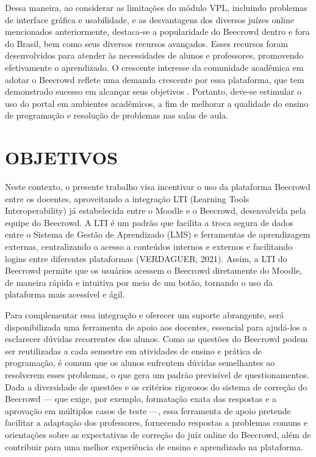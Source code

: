 Dessa maneira, ao considerar as limitações do módulo VPL, incluindo problemas de interface gráfica e usabilidade, e as desvantagens dos diversos juízes online mencionados anteriormente, destaca-se a popularidade do Beecrowd dentro e fora do Brasil, bem como seus diversos recursos avançados. Esses recursos foram desenvolvidos para atender às necessidades de alunos e professores, promovendo efetivamente o aprendizado. O crescente interesse da comunidade acadêmica em adotar o Beecrowd reflete uma demanda crescente por essa plataforma, que tem demonstrado sucesso em alcançar seus objetivos \cite[p.~31]{ferreira2022}. Portanto, deve-se estimular o uso do portal em ambientes acadêmicos, a fim de melhorar a qualidade do ensino de programação e resolução de problemas nas salas de aula.

\section{OBJETIVOS}

Neste contexto, o presente trabalho visa incentivar o uso da plataforma Beecrowd entre os docentes, aproveitando a integração LTI (Learning Tools Interoperability) já estabelecida entre o Moodle e o Beecrowd, desenvolvida pela equipe do Beecrowd. A LTI é um padrão que facilita a troca segura de dados entre o Sistema de Gestão de Aprendizado (LMS) e ferramentas de aprendizagem externas, centralizando o acesso a conteúdos internos e externos e facilitando logins entre diferentes plataformas (VERDAGUER, 2021). Assim, a LTI do Beecrowd permite que os usuários acessem o Beecrowd diretamente do Moodle, de maneira rápida e intuitiva por meio de um botão, tornando o uso da plataforma mais acessível e ágil.

Para complementar essa integração e oferecer um suporte abrangente, será disponibilizada uma ferramenta de apoio aos docentes, essencial para ajudá-los a esclarecer dúvidas recorrentes dos alunos. Como as questões do Beecrowd podem ser reutilizadas a cada semestre em atividades de ensino e prática de programação, é comum que os alunos enfrentem dúvidas semelhantes ao resolverem esses problemas, o que gera um padrão previsível de questionamentos. Dada a diversidade de questões e os critérios rigorosos do sistema de correção do Beecrowd — que exige, por exemplo, formatação exata das respostas e a aprovação em múltiplos casos de teste —, essa ferramenta de apoio pretende facilitar a adaptação dos professores, fornecendo respostas a problemas comuns e orientações sobre as expectativas de correção do juíz online do Beecrowd, além de contribuir para uma melhor experiência de ensino e aprendizado na plataforma.

